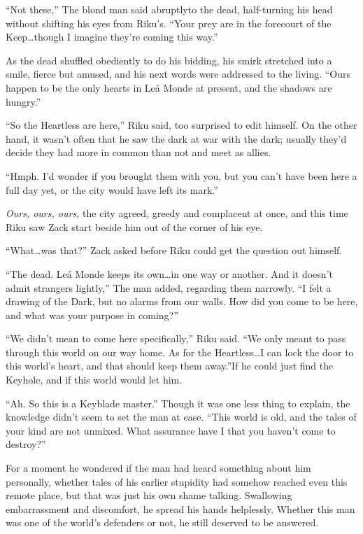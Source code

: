 ``Not these,'' The blond man said abruptly\textemdash to the dead, half-turning his head without shifting his eyes from Riku's. ``Your prey are in the forecourt of the Keep\ldots though I imagine they're coming this way.''

As the dead shuffled obediently to do his bidding, his smirk stretched into a smile, fierce but amused, and his next words were addressed to the living. ``Ours happen to be the only hearts in Leá Monde at present, and the shadows are hungry.''

``So the Heartless are here,'' Riku said, too surprised to edit himself. On the other hand, it wasn't often that he saw the dark at war with the dark; usually they'd decide they had more in common than not and meet as allies.

``Hmph. I'd wonder if you brought them with you, but you can't have been here a full day yet, or the city would have left its mark.''

\emph{Ours, ours, ours,} the city agreed, greedy and complacent at once, and this time Riku saw Zack start beside him out of the corner of his eye.

``What\ldots was that?'' Zack asked before Riku could get the question out himself.

``The dead. Leá Monde keeps its own\ldots in one way or another. And it doesn't admit strangers lightly,'' The man added, regarding them narrowly. ``I felt a drawing of the Dark, but no alarms from our walls. How did you come to be here, and what was your purpose in coming?''

``We didn't mean to come here specifically,'' Riku said. ``We only meant to pass through this world on our way home. As for the Heartless\ldots I can lock the door to this world's heart, and that should keep them away.''If he could just find the Keyhole, and if this world would let him.

``Ah. So this is a Keyblade master.'' Though it was one less thing to explain, the knowledge didn't seem to set the man at ease. ``This world is old, and the tales of your kind are not unmixed. What assurance have I that you haven't come to destroy?''

For a moment he wondered if the man had heard something about him personally, whether tales of his earlier stupidity had somehow reached even this remote place, but that was just his own shame talking. Swallowing embarrassment and discomfort, he spread his hands helplessly. Whether this man was one of the world's defenders or not, he still deserved to be answered. 

